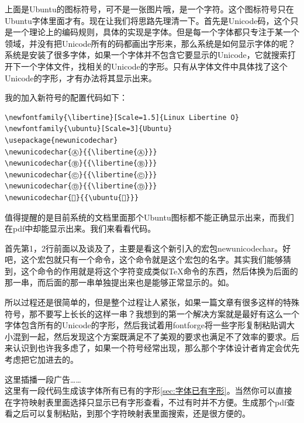 \documentclass[11pt,oneside]{book}
\begin{document}
\begin{common-format}
上面是Ubuntu的图标符号，可不是一张图片哦，是一个字符。这个图标符号只在Ubuntu字体里面才有。现在让我们将思路先理清一下。首先是Unicode码，这个只是一个理论上的编码规则，具体的实现是字体。但是每一个字体都只专注于某一个领域，并没有把Unicode所有的码都画出字形来，那么系统是如何显示字体的呢？系统是安装了很多字体，如果一个字体并不包含它要显示的Unicode，它就搜索打开下一个字体文件，找相关的Unicode的字形。只有从字体文件中具体找了这个Unicode的字形，才有办法将其显示出来。

我的加入新符号的配置代码如下：
\begin{Verbatim}
\newfontfamily{\libertine}[Scale=1.5]{Linux Libertine O}
\newfontfamily{\ubuntu}[Scale=3]{Ubuntu}
\usepackage{newunicodechar}
\newunicodechar{Ⓐ}{{\libertine{Ⓐ}}}
\newunicodechar{Ⓑ}{{\libertine{Ⓑ}}}
\newunicodechar{Ⓒ}{{\libertine{Ⓒ}}} 
\newunicodechar{Ⓓ}{{\libertine{Ⓓ}}}
\newunicodechar{}{{\ubuntu{}}}
\end{Verbatim}

值得提醒的是目前系统的文档里面那个Ubuntu图标都不能正确显示出来，而我们在pdf中却能显示出来。我们来看看代码。

首先第1，2行前面以及谈及了，主要是看这个新引入的宏包newunicodechar。好吧，这个宏包就只有一个命令，这个命令就是这个宏包的名字。其实我们能够猜到，这个命令的作用就是将这个字符变成类似\TeX 命令的东西，然后体换为后面的那一串，而后面的那一串单独提出来也是能够正常显示的。如{}。

\begin{fancycolorbox}
所以过程还是很简单的，但是整个过程让人紧张，如果一篇文章有很多这样的特殊符号，那不要写上长长的这样一串？我想到的第一个解决方案就是最好有这么一个字体包含所有的Unicode的字形，然后我试着用fontforge将一些字形复制粘贴调大小混到一起，然后发现这个方案既满足不了美观的要求也满足不了效率的要求。后来认识到也许我多虑了，如果一个符号经常出现，那么那个字体设计者肯定会优先考虑把它加进去的。
\end{fancycolorbox}

这里插播一段广告……\\
这里有一段代码生成该字体所有已有的字形\ref{sec:字体已有字形}。当然你可以直接在字符映射表里面选择只显示已有字形查看，不过有时并不方便。生成那个pdf查看之后可以复制粘贴，到那个字符映射表里面搜索，还是很方便的。



\end{common-format}
\end{document}
